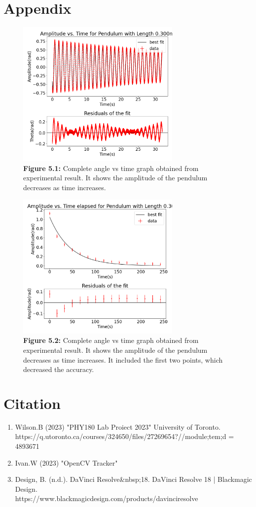 \documentclass{article}
\begin{document}
\section{Appendix}
    \begin{figure}[H]
    \centering
        \includegraphics[width=8cm]{all_angle_graph.png}
        \caption*{\textbf{Figure 5.1:} Complete angle vs time graph obtained from  experimental result. It shows the amplitude of the pendulum decreases as time increases.}
    \end{figure}
    \begin{figure}[H]
    \centering
        \includegraphics[width=8cm]{exp_graph.png}
        \caption*{\textbf{Figure 5.2:} Complete angle vs time graph obtained from  experimental result. It shows the amplitude of the pendulum decreases as time increases. It included the first two points, which decreased the accuracy.}
    \end{figure}

\section{Citation}
    \begin{enumerate}
    \item Wilson.B (2023) "PHY180 Lab Proiect 2023"  University of Toronto. \\ 
    https://q.utoronto.ca/courses/324650/files/27269654?//module;tem;d = 4893671
    \item Ivan.W (2023) "OpenCV Tracker"
    \item Design, B. (n.d.). DaVinci Resolve\&nbsp;18. DaVinci Resolve 18 | Blackmagic Design. \\https://www.blackmagicdesign.com/products/davinciresolve 
    \end{enumerate}


    
\end{document}
